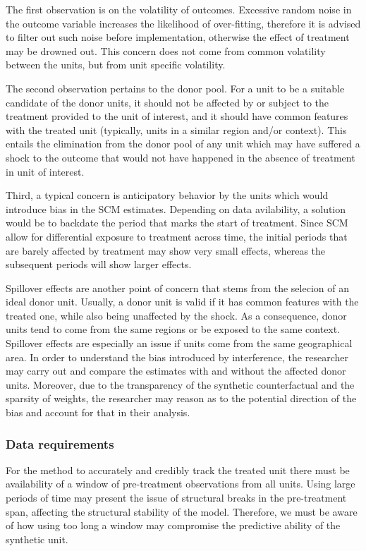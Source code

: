 \documentclass[12pt,a4paper,draft]{article}
\begin{document}
The first observation is on the volatility of outcomes. Excessive random noise in the 
outcome variable increases the likelihood of over-fitting, therefore it is advised to 
filter out such noise before implementation, otherwise the effect of treatment 
may be drowned out. This concern does not come from common volatility between the 
units, but from unit specific volatility.

The second observation pertains to the donor pool. For a unit to be a suitable 
candidate of the donor units, it should not be affected by or subject to the 
treatment provided to the unit of interest, and it should have common features 
with the treated unit (typically, units in a similar region and/or context). 
This entails the elimination from the 
donor pool of any unit which may have suffered a shock to the outcome that would 
not have happened in the absence of treatment in unit of interest.


Third, a typical concern is anticipatory behavior by the units which would 
introduce bias in the SCM estimates. Depending on data avilability, a solution 
would be to backdate the period that marks the start of treatment. Since SCM allow 
for differential exposure to treatment across time, the initial periods that 
are barely affected by treatment may show very small effects, whereas the subsequent 
periods will show larger effects.

Spillover effects are another point of concern that stems from the selecion of 
an ideal donor unit. Usually, a donor unit is valid if it has common features 
with the treated one, while also being unaffected by the shock. As a consequence, 
donor units tend to come from the same regions or be exposed to the same 
context. Spillover effects are especially an issue if units come from the same 
geographical area. In order to understand the bias introduced by interference, 
the researcher may carry out and compare the estimates with and without the 
affected donor units. Moreover, due to the transparency of the synthetic 
counterfactual and the sparsity of weights, the researcher may reason as to the 
potential direction of the bias and account for that in their analysis.

\subsubsection{Data requirements}

For the method to accurately and credibly track the treated unit there must be 
availability of a window of pre-treatment observations from all units. Using large 
periods of time may present the issue of structural breaks in the pre-treatment 
span, affecting the structural stability of the model. 
Therefore, we must be aware of how using too long a window may compromise the 
predictive ability of the synthetic unit. 
\end{document}
